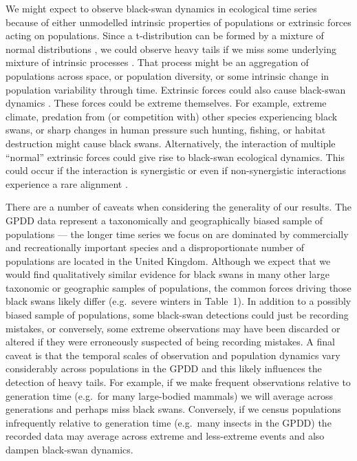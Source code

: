 We might expect to observe black-swan dynamics in ecological time series because of either unmodelled intrinsic properties of populations or extrinsic forces acting on populations. Since a t-distribution can be formed by a mixture of normal distributions \citep{gelman2014}, we could observe heavy tails if we miss some underlying mixture of intrinsic processes \citep{allen2001}. That process might be an aggregation of populations across space, or population diversity, or some intrinsic change in population variability through time. Extrinsic forces could also cause black-swan dynamics \citep[e.g.][]{nunez2012}. These forces could be extreme themselves. For example, extreme climate, predation from (or competition with) other species experiencing black swans, or sharp changes in human pressure such hunting, fishing, or habitat destruction might cause black swans. Alternatively, the interaction of multiple ``normal'' extrinsic forces could give rise to black-swan ecological dynamics. This could occur if the interaction is synergistic \citep[e.g.][]{kirby2009} or even if non-synergistic interactions experience a rare alignment \citep{denny2009}.

There are a number of caveats when considering the generality of our results. The GPDD data represent a taxonomically and geographically biased sample of populations --- the longer time series we focus on are dominated by commercially and recreationally important species and a disproportionate number of populations are located in the United Kingdom. Although we expect that we would find qualitatively similar evidence for black swans in many other large taxonomic or geographic samples of populations, the common forces driving those black swans likely differ (e.g.~severe winters in Table~1). In addition to a possibly biased sample of populations, some black-swan detections could just be recording mistakes, or conversely, some extreme observations may have been discarded or altered if they were erroneously suspected of being recording mistakes. A final caveat is that the temporal scales of observation and population dynamics vary considerably across populations in the GPDD and this likely influences the detection of heavy tails. For example, if we make frequent observations relative to generation time (e.g.~for many large-bodied mammals) we will average across generations and perhaps miss black swans. Conversely, if we census populations infrequently relative to generation time (e.g.~many insects in the GPDD) the recorded data may average across extreme and less-extreme events and also dampen black-swan dynamics.

